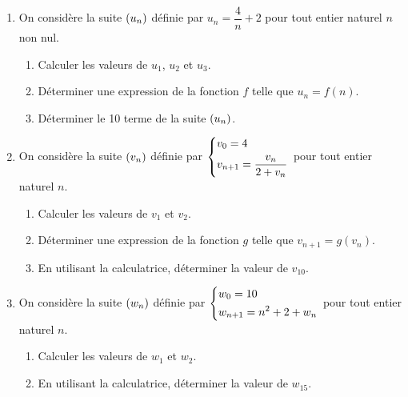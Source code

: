 \documentclass[a4paper,11pt]{article}
\begin{document}
\begin{enumerate}
	\item On considère la suite $\suiten$ définie par $u_n = \dfrac{4}{n}+2$ pour tout entier naturel $n$ non nul.
	\begin{enumerate}
		\item Calculer les valeurs de $u_1$, $u_2$ et $u_3$.
		\item Déterminer une expression de la fonction $f$ telle que $u_n=f(n)$.
		\item Déterminer le 10\ieme{} terme de la suite $\suiten$.
	\end{enumerate}
	\item On considère la suite $\suiten[v]$ définie par $\begin{dcases} v_0 = 4 \\ v_{n+1}=\dfrac{v_n} {2+v_n} \end{dcases}$ pour tout entier naturel $n$.
	\begin{enumerate}
		\item Calculer les valeurs de $v_1$ et $v_2$.
		\item Déterminer une expression de la fonction $g$ telle que $v_{n+1}=g(v_n)$.
		\item En utilisant la calculatrice, déterminer la valeur de $v_{10}$.
	\end{enumerate}
	\item On considère la suite $\suiten[w]$ définie par $\begin{dcases} w_0 = 10 \\ w_{n+1}=n^2 + 2 + w_n \end{dcases}$ pour tout entier naturel $n$.
	\begin{enumerate}
		\item Calculer les valeurs de $w_1$ et $w_2$.
		\item En utilisant la calculatrice, déterminer la valeur de $w_{15}$.
	\end{enumerate}
\end{enumerate}

\bigskip

\end{document}

